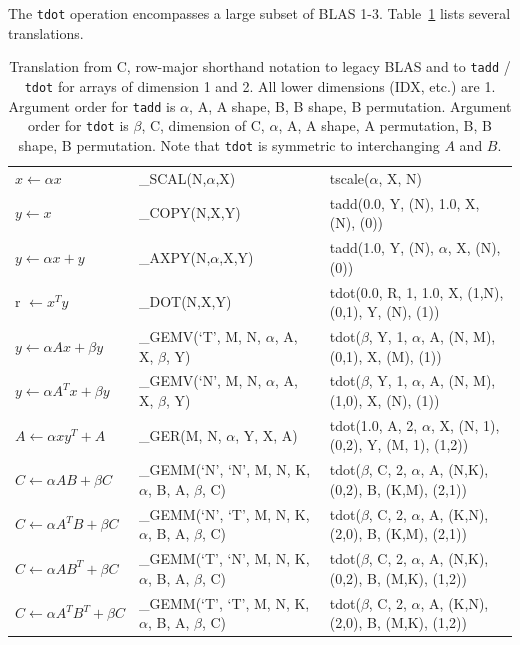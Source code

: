 \documentclass[preprint]{sigplanconf}
\begin{document}
  The {\tt tdot} operation encompasses a large subset of BLAS 1-3.  Table~\ref{t:blas} lists several
translations.
\begin{table}
\begin{tabular}{lll}
$x \gets \alpha x$ & \_SCAL(N,$\alpha$,X) %
    & tscale($\alpha$, X, N) \\
$y \gets x$ & \_COPY(N,X,Y) %
    & tadd(0.0, Y, (N), 1.0, X, (N), (0)) \\
$y \gets \alpha x + y$ & \_AXPY(N,$\alpha$,X,Y) %
    & tadd(1.0, Y, (N), $\alpha$, X, (N), (0)) \\
r $\gets x^T y$ & \_DOT(N,X,Y) %
    & tdot(0.0, R, 1, 1.0, X, (1,N), (0,1), Y, (N), (1)) \\
$y \gets \alpha A x + \beta y$ & \_GEMV(`T', M, N, $\alpha$, A, X, $\beta$, Y) %
    & tdot($\beta$, Y, 1, $\alpha$, A, (N, M), (0,1), X, (M), (1)) \\
$y \gets \alpha A^T x + \beta y$ & \_GEMV(`N', M, N, $\alpha$, A, X, $\beta$, Y) %
    & tdot($\beta$, Y, 1, $\alpha$, A, (N, M), (1,0), X, (N), (1)) \\
$A \gets \alpha x y^T + A$ & \_GER(M, N, $\alpha$, Y, X, A) %
    & tdot(1.0, A, 2, $\alpha$, X, (N, 1), (0,2), Y, (M, 1), (1,2)) \\
$C \gets \alpha A B + \beta C$ & \_GEMM(`N', `N', M, N, K, $\alpha$, B, A, $\beta$, C) %
    & tdot($\beta$, C, 2, $\alpha$, A, (N,K), (0,2), B, (K,M), (2,1)) \\
$C \gets \alpha A^T B + \beta C$ & \_GEMM(`N', `T', M, N, K, $\alpha$, B, A, $\beta$, C) %
    & tdot($\beta$, C, 2, $\alpha$, A, (K,N), (2,0), B, (K,M), (2,1)) \\
$C \gets \alpha A B^T + \beta C$ & \_GEMM(`T', `N', M, N, K, $\alpha$, B, A, $\beta$, C) %
    & tdot($\beta$, C, 2, $\alpha$, A, (N,K), (0,2), B, (M,K), (1,2)) \\
$C \gets \alpha A^T B^T + \beta C$ & \_GEMM(`T', `T', M, N, K, $\alpha$, B, A, $\beta$, C) %
    & tdot($\beta$, C, 2, $\alpha$, A, (K,N), (2,0), B, (M,K), (1,2)) \\
\end{tabular}
\caption{Translation from C, row-major shorthand notation to legacy BLAS and
to {\tt tadd} / {\tt tdot} for arrays of dimension 1 and 2.  All lower dimensions (IDX, etc.) are 1.
Argument order for {\tt tadd} is $\alpha$, A, A shape, B, B shape, B permutation.
Argument order for {\tt tdot} is  $\beta$, C, dimension of C, $\alpha$, A, A shape, A permutation, B, B shape, B permutation.  Note that {\tt tdot} is symmetric to interchanging $A$ and $B$.}\label{t:blas}
\end{table}
\end{document}
